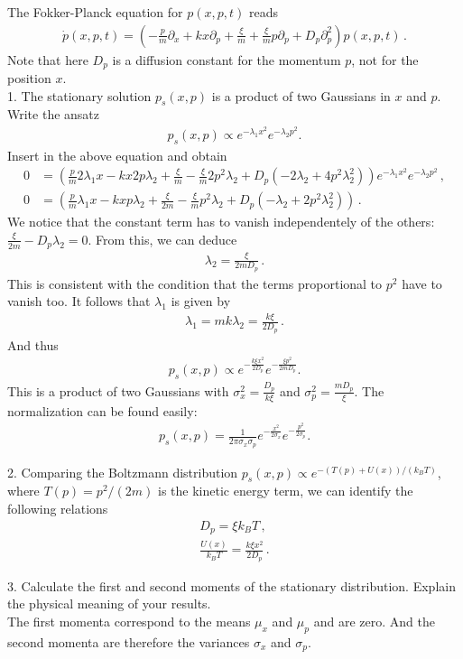 The Fokker-Planck equation for $p(x,p,t)$ reads
\begin{align}
\dot{p}(x,p,t) = \left( - \frac{p}{m} \partial_x + kx \partial_p + \frac{\xi}{m} + \frac{\xi}{m} p \partial_p + D_p \partial^2_p \right) p(x,p,t) \,.
\end{align}
Note that here $D_p$ is a diffusion constant for the momentum $p$, not for the position $x$. \\

1. The stationary solution $p_s(x,p)$ is a product of two Gaussians in $x$ and $p$. Write the ansatz
\begin{align}
p_s(x,p) \propto e^{-\lambda_1 x^2}e^{-\lambda_2 p^2}.
\end{align}
Insert in the above equation and obtain
\begin{align}
0 &= \left( \frac{p}{m} 2\lambda_1 x - kx 2p\lambda_2 + \frac{\xi}{m} - \frac{\xi}{m} 2p^2\lambda_2 + D_p (-2\lambda_2 + 4p^2\lambda_2^2) \right) e^{-\lambda_1 x^2}e^{-\lambda_2 p^2} \,, \\
0 &= \left( \frac{p}{m} \lambda_1 x - kx p\lambda_2 + \frac{\xi}{2m} - \frac{\xi}{m} p^2\lambda_2 + D_p (-\lambda_2 + 2p^2\lambda_2^2) \right) \,.
\end{align}
We notice that the constant term has to vanish independentely of the others: $\frac{\xi}{2m} - D_p \lambda_2 = 0$. From this, we can deduce
\begin{align}
\lambda_2 = \frac{\xi}{2mD_p} \,.
\end{align}
This is consistent with the condition that the terms proportional to $p^2$ have to vanish too.
It follows that $\lambda_1$ is given by
\begin{align}
\lambda_1 = mk\lambda_2 = \frac{k\xi}{2D_p} \,.
\end{align}
And thus
\begin{align}
p_s(x,p) \propto e^{-\frac{k\xi x^2}{2D_p}}e^{-\frac{\xi p^2}{2mD_p}}.
\end{align}
This is a product of two Gaussians with $\sigma_x^2 = \frac{D_p}{k\xi}$ and $\sigma_p^2 = \frac{m D_p}{\xi}$. The normalization can be found easily:
\begin{align}
p_s(x,p) = \frac{1}{2\pi \sigma_x \sigma_p} e^{-\frac{x^2}{2\sigma_x}}e^{-\frac{p^2}{2\sigma_p}}.
\end{align}

2. Comparing the Boltzmann distribution $p_s(x,p) \propto e^{-(T(p)+U(x))/(k_B T)}$, where $T(p) = p^2/(2m)$ is the kinetic energy term, we can identify the following relations
\begin{align}
D_p = \xi k_B T \,, \\
\frac{U(x)}{k_B T} = \frac{k\xi x^2}{2D_p} \,.
\end{align}

3. Calculate the first and second moments of the stationary distribution. Explain the physical meaning of your results. \\
The first momenta correspond to the means $\mu_x$ and $\mu_p$ and are zero. And the second momenta are therefore the variances $\sigma_x$ and $\sigma_p$.